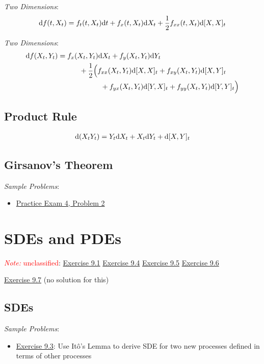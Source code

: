 \documentclass[12pt]{article}
\newcommand{\note}[1]{\textcolor{red}{\textit{Note:} #1}}
\begin{document}
\textit{Two Dimensions}:
\begin{align*}
    \mathrm{d} f(t,X_t) = f_t(t,X_t)\mathrm{d} t + f_x(t,X_t)\mathrm{d} X_t + \frac{1}{2}f_{xx}(t,X_t) \mathrm{d}[X,X]_t
\end{align*}

\textit{Two Dimensions}:
\begin{align*}
    \mathrm{d} f(X_t,Y_t) &= f_x(X_t,Y_t)\mathrm{d} X_t + f_y(X_t,Y_t)\mathrm{d} Y_t 
    \\&\hspace{3em} + \frac{1}{2} \Big( f_{xx}(X_t,Y_t)\mathrm{d}[X,X]_t + f_{xy}(X_t,Y_t)\mathrm{d}[X,Y]_t 
    \\&\hspace{6em}+ f_{yx}(X_t,Y_t)\mathrm{d}[Y,X]_t + f_{yy}(X_t,Y_t)\mathrm{d}[Y,Y]_t \Big)
\end{align*}

\subsection{Product Rule}
\begin{align*}
    \mathrm{d}(X_tY_t) = Y_t\mathrm{d} X_t + X_t \mathrm{d} Y_t + \mathrm{d}[X,Y]_t 
\end{align*}

\subsection{Girsanov's Theorem}

\textit{Sample Problems}:
\begin{itemize}[nolistsep]
    \item \hyperref[Practice Exam 4, Problem 2]{Practice Exam 4, Problem 2}
\end{itemize}


\pagebreak
\section{SDEs and PDEs}
\note{unclassified}:
\hyperref[Exercise 9.4]{Exercise 9.1}
\hyperref[Exercise 9.4]{Exercise 9.4}
\hyperref[Exercise 9.5]{Exercise 9.5}
\hyperref[Exercise 9.6]{Exercise 9.6}

\hyperref[Exercise 9.7]{Exercise 9.7} (no solution for this)


\subsection{SDEs}

\textit{Sample Problems}:
\begin{itemize}[nolistsep]
    \item \hyperref[Exercise 9.3]{Exercise 9.3}: Use It\^o's Lemma to derive SDE for two new processes defined in terms of other processes
\end{itemize}
\end{document}
